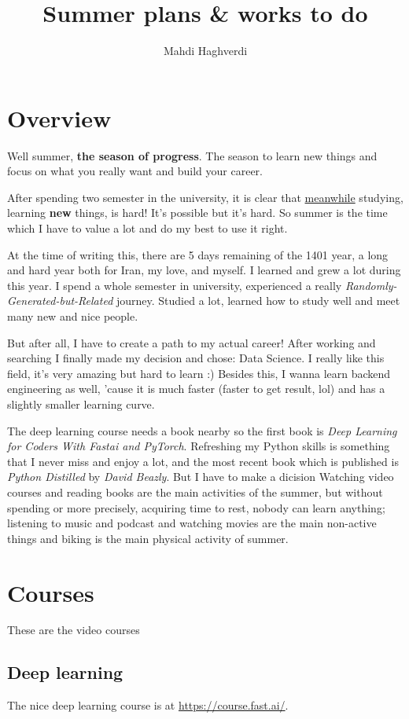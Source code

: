 \documentclass[12pt, dvipsnames, svgnames, x11names]{article}
\title{Summer plans \& works to do}
\author{Mahdi Haghverdi}
\date{}
\begin{document}
	\maketitle
	\tableofcontents
	\newpage 
	\section{Overview}
		Well summer, \textbf{the season of progress}. The season to learn new things and focus on what you really want and build your career.

		After spending two semester in the university, it is clear that \underline{meanwhile} studying, learning \textbf{new}  things, is hard! It's possible but it's hard. So summer is the time which I have to value a lot and do my best to use it right.
		
		At the time of writing this, there are 5 days remaining of the 1401 year, a long and hard year both for Iran, my love, and myself. I learned and grew a lot during this year. I spend a whole semester in university, experienced a really \textit{Randomly-Generated-but-Related} journey. Studied a lot, learned how to study well and meet many new and nice people.
		
		But after all, I have to create a path to my actual career! After working and searching I finally made my decision and chose: Data Science. I really like this field, it's very amazing but hard to learn :) Besides this, I wanna learn backend engineering as well, 'cause it is much faster (faster to get result, lol) and has a slightly smaller learning curve.
		
		The deep learning course needs a book nearby so the first book is \textit{Deep Learning for Coders With Fastai and PyTorch}.
		Refreshing my Python skills is something that I never miss and enjoy a lot, and the most recent book which is published is \textit{Python Distilled} by \textit{David Beazly}. But I have to make a dicision
		Watching video courses and reading books are the main activities of the summer, but without spending or more precisely, acquiring time to rest, nobody can learn anything; listening to music and podcast and watching movies are the main non-active things and biking is the main physical activity of summer.

	\section{Courses}
		These are the video courses
		
		\subsection{Deep learning}
			The nice deep learning course is at \url{https://course.fast.ai/}.
			
\end{document}
